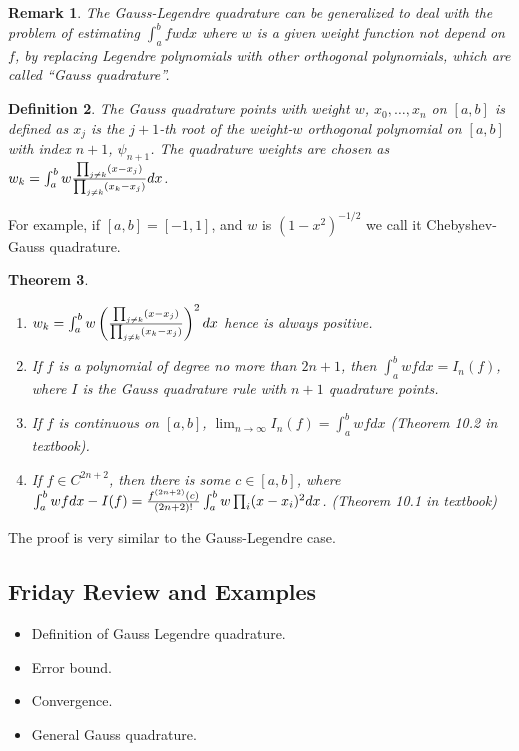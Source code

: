 \documentclass[20pt]{article} %
\theoremstyle{break}
\newtheorem{definition}{Definition}[section]
\newtheorem{thm}[definition]{Theorem}
\newtheorem{rem}[definition]{Remark}
\begin{document}
    \begin{rem} The Gauss-Legendre quadrature can be generalized to deal with the problem of estimating $\int_a^bfwdx$ where $w$ is a given weight function not depend on $f$, by replacing Legendre polynomials with other orthogonal polynomials, which are called ``Gauss quadrature''.
    \end{rem}

 \begin{definition}
  The Gauss quadrature points with weight $w$, $x_0,\dots, x_n$ on $[a, b]$ is defined as $x_j$ is the $j+1$-th root of the weight-$w$ orthogonal polynomial on $[a, b]$ with index $n+1$, $\psi_{n+1}$. The quadrature weights are chosen as $w_k=\int_a^bw{\prod_{j\not=k}(x-x_j)\over \prod_{j\not=k}(x_k-x_j)}dx$.
\end{definition}

 For example, if $[a, b]=[-1, 1]$, and $w$ is $(1-x^2)^{-1/2}$ we call it Chebyshev-Gauss quadrature.

\begin{thm}
  \begin{enumerate}
  \item $w_k=\int_a^bw\left({\prod_{j\not=k}(x-x_j)\over \prod_{j\not=k}(x_k-x_j)}\right)^2dx$ hence is always positive.
\item If $f$ is a polynomial of degree no more than $2n+1$, then $\int_a^bwfdx=I_n(f)$, where $I$ is the Gauss quadrature rule with $n+1$ quadrature points.
\item If $f$ is continuous on $[a, b]$, $\lim_{n\rightarrow\infty}I_n(f)=\int_a^bwfdx$ (Theorem 10.2 in textbook).
\item If $f\in C^{2n+2}$, then there is some $c\in [a, b]$, where $\int_a^bwfdx-I(f)={f^{(2n+2)}(c)\over (2n+2)!}\int_a^bw\prod_i(x-x_i)^2 dx$. (Theorem 10.1 in textbook)
  \end{enumerate}
\end{thm}

The proof is very similar to the Gauss-Legendre case.

\newpage

\subsection{Friday Review and Examples}

\begin{itemize}
\item Definition of Gauss Legendre quadrature.
\item Error bound.
\item Convergence.
\item General Gauss quadrature.
\end{itemize}
\end{document}
